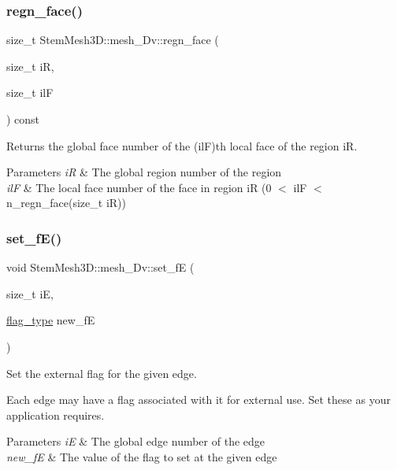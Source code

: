 \subsubsection{\texorpdfstring{regn\+\_\+face()}{regn\_face()}}
{\footnotesize\ttfamily size\+\_\+t Stem\+Mesh3\+D\+::mesh\+\_\+Dv\+::regn\+\_\+face (\begin{DoxyParamCaption}\item[{size\+\_\+t}]{iR,  }\item[{size\+\_\+t}]{ilF }\end{DoxyParamCaption}) const}



Returns the global face number of the (ilF)\textquotesingle{}th local face of the region iR. 


\begin{DoxyParams}{Parameters}
{\em iR} & The global region number of the region \\
\hline
{\em ilF} & The local face number of the face in region iR (0 $<$ ilF $<$ n\+\_\+regn\+\_\+face(size\+\_\+t i\+R)) \\
\hline
\end{DoxyParams}
\mbox{\label{classStemMesh3D_1_1mesh__3Dv_a6b4fa28dbbe68fc44b75e3cdb4ffe7a2}} 
\subsubsection{\texorpdfstring{set\+\_\+f\+E()}{set\_fE()}}
{\footnotesize\ttfamily void Stem\+Mesh3\+D\+::mesh\+\_\+Dv\+::set\+\_\+fE (\begin{DoxyParamCaption}\item[{size\+\_\+t}]{iE,  }\item[{\hyperlink{classStemMesh3D_1_1mesh__3Dv_a9544cba555b60f17f04fcd1689314338}{flag\+\_\+type}}]{new\+\_\+fE }\end{DoxyParamCaption})}



Set the external flag for the given edge. 

Each edge may have a flag associated with it for external use. Set these as your application requires. 
\begin{DoxyParams}{Parameters}
{\em iE} & The global edge number of the edge \\
\hline
{\em new\+\_\+fE} & The value of the flag to set at the given edge \\
\hline
\end{DoxyParams}
\mbox{\label{classStemMesh3D_1_1mesh__3Dv_aa5c3c8d360f8107e370c935222c6849d}} 
